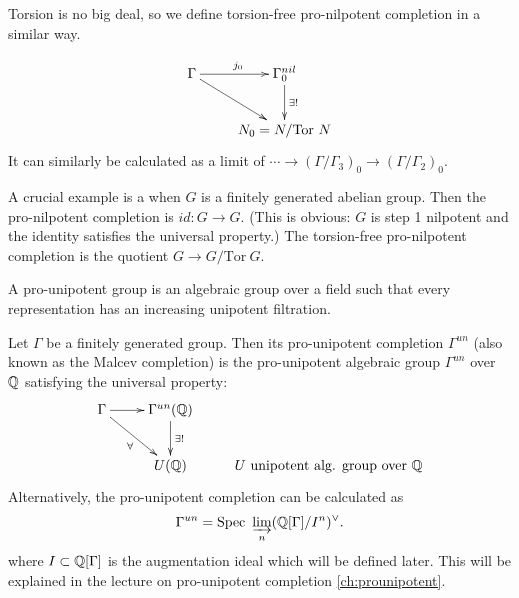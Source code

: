 \noindent Torsion is no big deal, so we define torsion-free pro-nilpotent completion in a similar way.
\begin{defn}
\[
\xymatrix{
\Gamma \ar[r]^{j_0} \ar[dr] & \Gamma_0^{nil} \ar[d]^{\exists !} \\
& N_0 = N/\mathrm{Tor~} N
}
\]
It can similarly be calculated as a limit of $\cdots \to (\Gamma / \Gamma_3)_0 \to (\Gamma / \Gamma_2)_0$.
\end{defn}

\begin{exam}
A crucial example is a when $G$ is a finitely generated abelian group. Then the pro-nilpotent completion is $id : G \to G$. (This is obvious: $G$ is step 1 nilpotent and the identity satisfies the universal property.) The torsion-free pro-nilpotent completion is the quotient $G \to G / \mathrm{Tor~} G$.
\end{exam}

\begin{defn}
A pro-unipotent group is an algebraic group over a field such that every representation has an increasing unipotent filtration.
\end{defn}

\begin{defn}\label{def:prounipotentcomp}
Let $\Gamma$ be a finitely generated group. Then its pro-unipotent completion $\Gamma^{un}$ (also known as the Malcev completion) is the pro-unipotent algebraic group $\Gamma^{un}$ over $\mathbb{Q}$ satisfying the universal property:
\[
\xymatrix{
\Gamma \ar[r] \ar[dr]_{\forall} & \Gamma^{un}(\Q) \ar[d]^{\exists !} & \\
& U(\Q) & \textrm{$U$ unipotent alg. group over $\Q$}
}
\]
Alternatively, the pro-unipotent completion can be calculated as
\[
\Gamma^{un} = \mathrm{Spec}~ \varinjlim_n(\mathbb{Q}[\Gamma]/I^n)^{\vee}.
\]
where $I \subset \mathbb{Q}[\Gamma]$ is the augmentation ideal which will be defined later. This will be explained in the lecture on pro-unipotent completion \ref{ch:prounipotent}.
\end{defn}